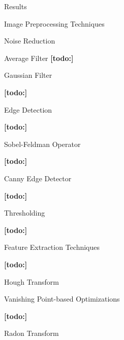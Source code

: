 \documentclass{matthijs}
\begin{document}
\begin{hoofdstuk}{Results}
\begin{paragraaf}{Image Preprocessing Techniques}
\begin{subparagraaf}{Noise Reduction}
\begin{subsubparagraaf}{Average Filter}
					\textbf{[todo:]}
				
				\end{subsubparagraaf}

				\begin{subsubparagraaf}{Gaussian Filter}

					\textbf{[todo:]}

				\end{subsubparagraaf}

			\end{subparagraaf}

			\begin{subparagraaf}{Edge Detection}

				\textbf{[todo:]}

				\begin{subsubparagraaf}{Sobel-Feldman Operator}

					\textbf{[todo:]}

				\end{subsubparagraaf}

				\begin{subsubparagraaf}{Canny Edge Detector}

					\textbf{[todo:]}

				\end{subsubparagraaf}

			\end{subparagraaf}

			\begin{subparagraaf}{Thresholding}

				\textbf{[todo:]}

			\end{subparagraaf}

		\end{paragraaf}

		\begin{paragraaf}{Feature Extraction Techniques}

			\textbf{[todo:]}

			\begin{subparagraaf}{Hough Transform}

				\begin{subsubparagraaf}{Vanishing Point-based Optimizations}

					\textbf{[todo:]}

				\end{subsubparagraaf}

			\end{subparagraaf}

			\begin{subparagraaf}{Radon Transform}


\end{subparagraaf}
\end{paragraaf}
\end{hoofdstuk}
\end{document}
